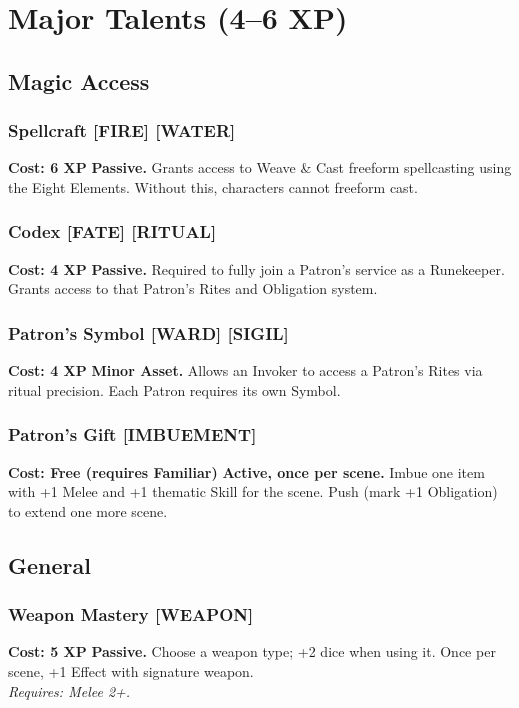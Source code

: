 \documentclass[12pt,a4paper]{book}
\begin{document}
\section{Major Talents (4--6 XP)}
\label{sec:major-talents}

\subsection*{Magic Access}
\label{sec:major-magic-access}

\subsubsection*{Spellcraft \textnormal{[FIRE] [WATER]}}
\label{talent:spellcraft-major}
\textbf{Cost: 6 XP} \textbf{Passive.} Grants access to Weave \& Cast freeform spellcasting using the Eight Elements. Without this, characters cannot freeform cast.

\subsubsection*{Codex \textnormal{[FATE] [RITUAL]}}
\label{talent:codex}
\textbf{Cost: 4 XP} \textbf{Passive.} Required to fully join a Patron's service as a Runekeeper. Grants access to that Patron's Rites and Obligation system.

\subsubsection*{Patron's Symbol \textnormal{[WARD] [SIGIL]}}
\label{talent:patrons-symbol}
\textbf{Cost: 4 XP} \textbf{Minor Asset.} Allows an Invoker to access a Patron's Rites via ritual precision. Each Patron requires its own Symbol.

\subsubsection*{Patron's Gift \textnormal{[IMBUEMENT]}}
\label{talent:patrons-gift}
\textbf{Cost: Free (requires Familiar)} \textbf{Active, once per scene.} Imbue one item with +1 Melee and +1 thematic Skill for the scene. Push (mark +1 Obligation) to extend one more scene.

\subsection*{General}
\label{sec:major-general}

\subsubsection*{Weapon Mastery \textnormal{[WEAPON]}}
\label{talent:weapon-mastery}
\textbf{Cost: 5 XP} \textbf{Passive.} Choose a weapon type; +2 dice when using it. Once per scene, +1 Effect with signature weapon. \\
\textit{Requires: Melee 2+.}
\end{document}
